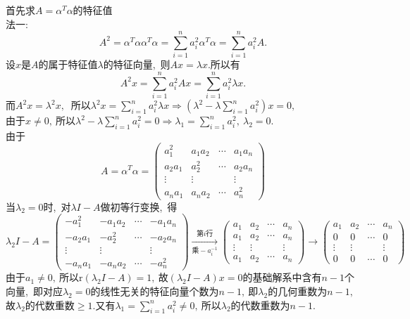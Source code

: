 	\begin{solution}
		首先求$A=\alpha^T\alpha$的特征值\\
		法一:
		$$A^2=\alpha^T\alpha\alpha^T\alpha=\sum\limits_{i=1}^{n}a_i^2\alpha^T\alpha=\sum\limits_{i=1}^{n}a_i^2A.$$
		设$x$是$A$的属于特征值$\lambda$的特征向量,\ 则$Ax=\lambda x.$所以有
		$$A^2x=\sum\limits_{i=1}^{n}a_i^2 Ax=\sum\limits_{i=1}^{n}a_i^2\lambda x.$$
		而$A^2x=\lambda^2x,\ $
		所以$\lambda^2 x=\sum\limits_{i=1}^{n}a_i^2\lambda x\Rightarrow \left(\lambda^2-\lambda\sum\limits_{i=1}^{n}a_i^2\right)x=0,\ $\\
		由于$x\neq 0,\ $所以$\lambda^2-\lambda\sum\limits_{i=1}^{n}a_i^2=0\Rightarrow \lambda_1=\sum\limits_{i=1}^{n}a_i^2,\ \lambda_2=0.$\\
		由于
		$$A=\alpha^T\alpha=\left(\begin{matrix}
			a_1^2  & a_1a_2 & \cdots &a_1a_n\\
			a_2a_1 & a_2^2  & \cdots &a_2a_n\\
			\vdots & \vdots &        &\vdots\\
			a_na_1 & a_na_2 &\cdots  &a_n^2
		\end{matrix}\right)$$
		当$\lambda_2=0$时,\ 对$\lambda I-A$做初等行变换,\ 得
		$$\lambda_2I-A=\left(\begin{matrix}
			-a_1^2  & -a_1a_2 & \cdots &-a_1a_n\\
			-a_2a_1 & -a_2^2  & \cdots &-a_2a_n\\
			\vdots  & \vdots  &        &\vdots\\
			-a_na_1 & -a_na_2 &\cdots  &-a_n^2
		\end{matrix}\right)\xrightarrow[\text{乘}-a_i^{-1}]{\text{第$i$行}}\left(\begin{matrix}
		a_1    & a_2    & \cdots &a_n\\
		a_1    & a_2    & \cdots &a_n\\
		\vdots & \vdots &        &\vdots\\
		a_1    & a_2    &\cdots  &a_n
		\end{matrix}\right)\rightarrow\left(\begin{matrix}
		a_1    & a_2    & \cdots &a_n\\
		0      & 0      & \cdots &0  \\
		\vdots & \vdots &        &\vdots\\
		0    & 0      &\cdots  &0
		\end{matrix}\right)$$
	由于$a_1\neq 0,\ $所以$\mathrm{r}(\lambda_2I-A)=1,\ $故$(\lambda_2I-A)x=0$的基础解系中含有$n-1$个向量,\ 即对应$\lambda_2=0$的线性无关的特征向量个数为$n-1,\ $即$\lambda_2$的几何重数为$n-1,\ $故$\lambda_2$的代数重数$\geqslant 1.$又有$\lambda_1=\sum\limits_{i=1}^{n}a_i^2\neq 0,\ $所以$\lambda_2$的代数重数为$n-1.$\\

\end{solution}
